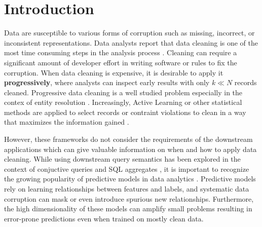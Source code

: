 \section{Introduction}
Data are susceptible to various forms of corruption such as missing, incorrect, or inconsistent representations.
Data analysts report that data cleaning is one of the most time consuming steps in the analysis process \cite{nytimes}.
Cleaning can require a significant amount of developer effort in writing software or rules to fix the corruption.
When data cleaning is expensive, it is desirable to apply it \textbf{progressively}, where analysts can inspect early results with only $k \ll N$ records cleaned.
Progressive data cleaning is a well studied problem especially in the contex of entity resolution \cite{whang2014incremental, papenbrock2015progressive, gruenheid2014incremental}.
Increasingly, Active Learning \cite{settles2010active} or other statistical methods are applied to select records or contraint violations to clean in a way that maximizes the information gained \cite{DBLP:journals/pvldb/YakoutENOI11, gokhale2014corleone, yakout2013don}.

However, these frameworks do not consider the requirements of the downstream applications which can give valuable information on when and how to apply data cleaning.
While using downstream query semantics has been explored in the context of conjuctive queries \cite{DBLP:conf/sigmod/BergmanMNT15} and SQL aggregates \cite{wang1999sample}, it is important to recognize the growing popularity of predictive models in data analytics \cite{bdas, alexandrov2014stratosphere, crotty2014tupleware, hellerstein2012madlib}.
Predictive models rely on learning relationships between features and labels, and systematic data corruption \cite{taylor1982introduction} can mask or even introduce spurious new relationships.
Furthermore, the high dimensionality of these models can amplify small problems \cite{xiaofeature} resulting in error-prone predictions even when trained on mostly clean data.

